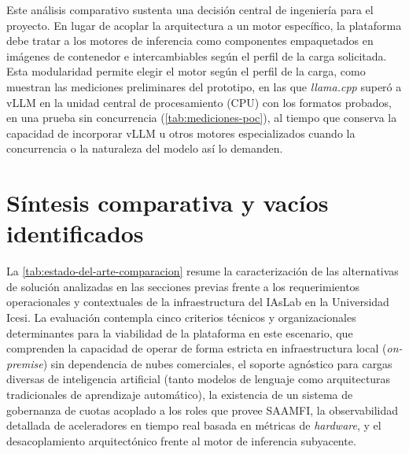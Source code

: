 Este análisis comparativo sustenta una decisión central de ingeniería para el proyecto. En lugar de acoplar la arquitectura a un motor específico, la plataforma debe tratar a los motores de inferencia como componentes empaquetados en imágenes de contenedor e intercambiables según el perfil de la carga solicitada. Esta modularidad permite elegir el motor según el perfil de la carga, como muestran las mediciones preliminares del prototipo, en las que \emph{llama.cpp} superó a vLLM en la unidad central de procesamiento (CPU) con los formatos probados, en una prueba sin concurrencia (\cref{tab:mediciones-poc}), al tiempo que conserva la capacidad de incorporar vLLM u otros motores especializados cuando la concurrencia o la naturaleza del modelo así lo demanden.

\section{Síntesis comparativa y vacíos identificados}\label{sec:sintesis-comparativa}

La \cref{tab:estado-del-arte-comparacion} resume la caracterización de las alternativas de solución analizadas en las secciones previas frente a los requerimientos operacionales y contextuales de la infraestructura del IAsLab en la Universidad Icesi. La evaluación contempla cinco criterios técnicos y organizacionales determinantes para la viabilidad de la plataforma en este escenario, que comprenden la capacidad de operar de forma estricta en infraestructura local (\emph{on-premise}) sin dependencia de nubes comerciales, el soporte agnóstico para cargas diversas de inteligencia artificial (tanto modelos de lenguaje como arquitecturas tradicionales de aprendizaje automático), la existencia de un sistema de gobernanza de cuotas acoplado a los roles que provee SAAMFI, la observabilidad detallada de aceleradores en tiempo real basada en métricas de \emph{hardware}, y el desacoplamiento arquitectónico frente al motor de inferencia subyacente.

